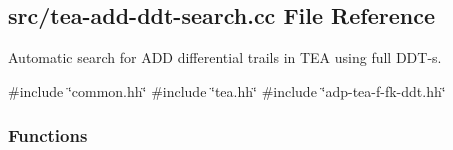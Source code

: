 \hypertarget{tea-add-ddt-search_8cc}{\subsection{src/tea-\/add-\/ddt-\/search.cc \-File \-Reference}
\label{tea-add-ddt-search_8cc}
}


\-Automatic search for \-A\-D\-D differential trails in \-T\-E\-A using full \-D\-D\-T-\/s.  


{\ttfamily \#include \char`\"{}common.\-hh\char`\"{}}\*
{\ttfamily \#include \char`\"{}tea.\-hh\char`\"{}}\*
{\ttfamily \#include \char`\"{}adp-\/tea-\/f-\/fk-\/ddt.\-hh\char`\"{}}\*
\subsubsection*{\-Functions}
